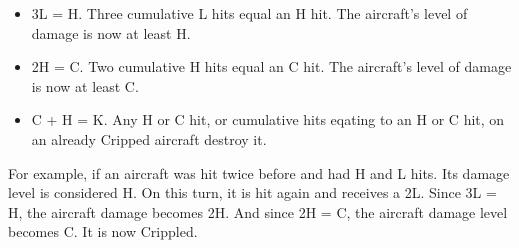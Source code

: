 \begin{itemize}
    \item 3L = H. Three cumulative L hits equal an H hit. The aircraft's level of damage is now at least H.
    \item 2H = C. Two cumulative H hits equal an C hit. The aircraft's level of damage is now at least C.
    \item C + H = K. Any H or C hit, or cumulative hits eqating to an H or C hit, on an already Cripped aircraft destroy it.
\end{itemize}

For example, if an aircraft was hit twice before and had H and L hits. Its damage level is considered H. On this turn, it is hit again and receives a 2L. Since 3L = H, the aircraft damage becomes 2H. And since 2H = C, the aircraft damage level becomes C. It is now Crippled.



